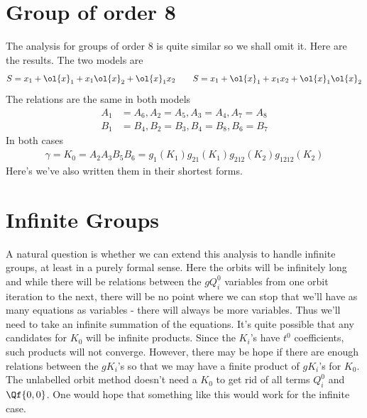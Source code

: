 \section{Group of order 8}
The analysis for groups of order 8 is quite similar so we shall omit it. Here are the results. 
The two models are
\begin{align}
	S = x_1+\ol{x}_1+x_1\ol{x}_2+\ol{x}_1x_2\quad\quad S  = x_1+\ol{x}_1+x_1x_2+\ol{x}_1\ol{x}_2
\end{align}
The relations are the same in both models
\begin{align}
	A_1 &= A_6, A_2 = A_5, A_3 = A_4, A_7 = A_8\\
	B_1 &= B_4, B_2 = B_3, B_4 = B_8, B_6 = B_7
\end{align}
In both cases
\begin{align}
	\gamma = K_0 =  A_2 A_3 B_5 B_6 = g_1(K_1) g_{21}(K_1) g_{212}(K_2) g_{1212}(K_2)
\end{align}
Here's we've also written them in their shortest forms.

\section{Infinite Groups}

A natural question is whether we can extend this analysis to handle infinite groups, at least in a purely formal sense. Here the orbits will be infinitely long and while there will be relations between the $g Q_i^0$ variables from one orbit iteration to the next, there will be no point where we can stop that we'll have as many equations as variables - there will always be more variables. Thus we'll need to take an infinite summation of the equations. It's quite possible that any candidates for $K_0$ will be infinite products. Since the $K_i$'s have $t^0$ coefficients, such products will not converge. However, there may be hope if there are enough relations between the $g K_i$'s so that we may have a finite product of $g K_i$'s for $K_0$. The unlabelled orbit method doesn't need a $K_0$ to get rid of all terms $Q_i^0$ and $\Qf{0,0}$. One would hope that something like this would work for the infinite case.

\endinput
